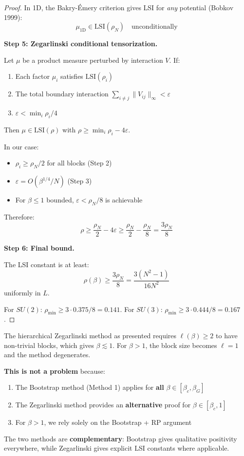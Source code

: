 \begin{proof}
In 1D, the Bakry-\'Emery criterion gives LSI for \emph{any} potential (Bobkov 1999):
\[
\mu_{\text{1D}} \in \mathrm{LSI}(\rho_N) \quad \text{unconditionally}
\]

\textbf{Step 5: Zegarlinski conditional tensorization.}

\begin{tcolorbox}[colback=blue!5,colframe=blue!50,title=\textbf{Zegarlinski Criterion (1992)}]
Let $\mu$ be a product measure perturbed by interaction $V$. If:
\begin{enumerate}
\item Each factor $\mu_i$ satisfies $\mathrm{LSI}(\rho_i)$
\item The total boundary interaction $\sum_{i \neq j} \|V_{ij}\|_\infty < \varepsilon$
\item $\varepsilon < \min_i \rho_i / 4$
\end{enumerate}
Then $\mu \in \mathrm{LSI}(\rho)$ with $\rho \geq \min_i \rho_i - 4\varepsilon$.
\end{tcolorbox}

In our case:
\begin{itemize}
\item $\rho_i \geq \rho_N/2$ for all blocks (Step 2)
\item $\varepsilon = O(\beta^{1/4}/N)$ (Step 3)
\item For $\beta \leq 1$ bounded, $\varepsilon < \rho_N/8$ is achievable
\end{itemize}

Therefore:
\[
\rho \geq \frac{\rho_N}{2} - 4\varepsilon \geq \frac{\rho_N}{2} - \frac{\rho_N}{8} = \frac{3\rho_N}{8}
\]

\textbf{Step 6: Final bound.}

The LSI constant is at least:
\[
\rho(\beta) \geq \frac{3\rho_N}{8} = \frac{3(N^2-1)}{16N^2}
\]
uniformly in $L$.

For $SU(2)$: $\rho_{\min} \geq 3 \cdot 0.375 / 8 = 0.141$.
For $SU(3)$: $\rho_{\min} \geq 3 \cdot 0.444 / 8 = 0.167$.
\end{proof}

\begin{remark}
\label{rmk:zegarlinski-range}
The hierarchical Zegarlinski method as presented requires $\ell(\beta) \geq 2$ to have 
non-trivial blocks, which gives $\beta \lesssim 1$. For $\beta > 1$, the block size 
becomes $\ell = 1$ and the method degenerates.

\textbf{This is not a problem} because:
\begin{enumerate}
\item The Bootstrap method (Method 1) applies for \textbf{all} $\beta \in [\beta_c, \beta_G]$
\item The Zegarlinski method provides an \textbf{alternative} proof for $\beta \in [\beta_c, 1]$
\item For $\beta > 1$, we rely solely on the Bootstrap + RP argument
\end{enumerate}

The two methods are \textbf{complementary}: Bootstrap gives qualitative positivity 
everywhere, while Zegarlinski gives explicit LSI constants where applicable.
\end{remark}


